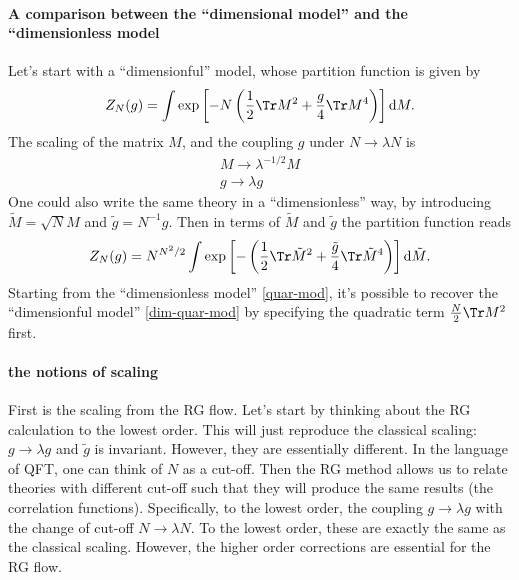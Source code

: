 
\paragraph{A comparison between the ``dimensional model'' and the ``dimensionless model}

Let's start with a ``dimensionful'' model, whose partition function is given by
\begin{equation}\label{dim-quar-mod}
	Z_N (g) = \int \mathrm{exp}\left[- N \left(\frac{1}{2}\Tr M^2 + \frac{g}{4} \Tr M^4 \right)\right]\mathrm{d} M.
\end{equation}
The scaling of the matrix $M$, and the coupling $g$ under $N \to \lambda N$ is
\begin{align*}
	M \to \lambda^{-1 / 2}M \\
	g \to \lambda g
\end{align*}
One could also write the same theory in a ``dimensionless'' way,
by introducing $\tilde{M} = \sqrt{N} M$ and $\tilde{g} = N^{-1}g$.
Then in terms of $\tilde{M}$ and $\tilde{g}$ the partition function reads
\begin{equation}\label{quar-mod}
	Z_N (g) = N^{N^2 / 2} \int \mathrm{exp}\left[- \left(\frac{1}{2} \Tr \tilde{M}^2 
	+ \frac{\tilde{g}}{4} \Tr \tilde{M}^4\right)\right] \mathrm{d}\tilde{M}.
\end{equation}
Starting from the ``dimensionless model'' \eqref{quar-mod},
it's possible to recover the ``dimensionful model'' \eqref{dim-quar-mod} by specifying the quadratic term $\frac{N}{2}\Tr M^2$ first.

\paragraph{the notions of scaling}

First is the scaling from the RG flow.
Let's start by thinking about the RG calculation to the lowest order.
This will just reproduce the classical scaling: $g \to \lambda g$ and $\tilde{g}$ is invariant.
However, they are essentially different.
In the language of QFT, one can think of $N$ as a cut-off.
Then the RG method allows us to relate theories with different cut-off such that they will produce the same results (the correlation functions).
Specifically, to the lowest order, the coupling $g\to \lambda g$ with the change of cut-off $N\to \lambda N$.
To the lowest order, these are exactly the same as the classical scaling.
However, the higher order corrections are essential for the RG flow.

